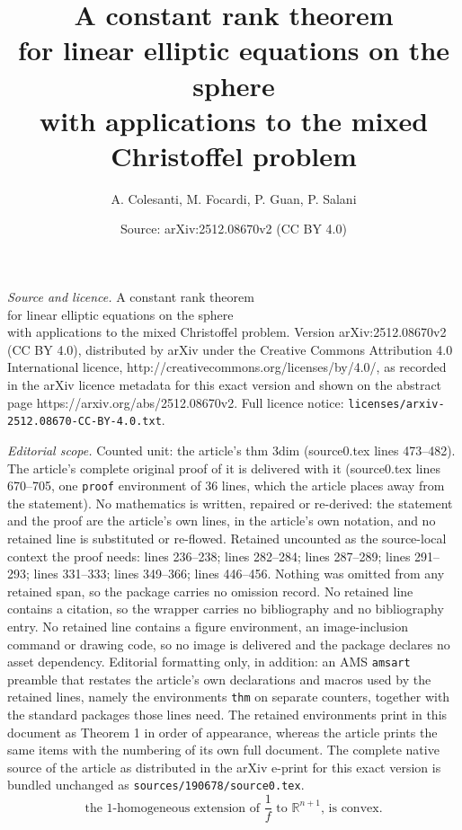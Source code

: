 \documentclass[10pt,a4paper]{amsart}
\title{A constant rank theorem\\ for linear elliptic equations on the sphere\\ with applications to the mixed Christoffel problem}
\author{A. Colesanti, M. Focardi, P. Guan, P. Salani}
\date{Source: arXiv:2512.08670v2 (CC BY 4.0)}
\newcommand{\R}{\mathbb R}
\begin{document}
\maketitle

\noindent\emph{Source and licence.} A constant rank theorem\\ for linear elliptic equations on the sphere\\ with applications to the mixed Christoffel problem. Version arXiv:2512.08670v2 (CC BY 4.0), distributed by arXiv under the Creative Commons Attribution 4.0 International licence, http://creativecommons.org/licenses/by/4.0/, as recorded in the arXiv licence metadata for this exact version and shown on the abstract page https://arxiv.org/abs/2512.08670v2. Full licence notice: \texttt{licenses/arxiv-2512.08670-CC-BY-4.0.txt}.\par\smallskip

\noindent\textit{Editorial scope.} Counted unit: the article's thm 3dim (source0.tex lines 473--482). The article's complete original proof of it is delivered with it (source0.tex lines 670--705, one \texttt{proof} environment of 36 lines, which the article places away from the statement). No mathematics is written, repaired or re-derived: the statement and the proof are the article's own lines, in the article's own notation, and no retained line is substituted or re-flowed.  Retained uncounted as the source-local context the proof needs: lines 236--238; lines 282--284; lines 287--289; lines 291--293; lines 331--333; lines 349--366; lines 446--456.  Nothing was omitted from any retained span, so the package carries no omission record.  No retained line contains a citation, so the wrapper carries no bibliography and no bibliography entry.  No retained line contains a figure environment, an image-inclusion command or drawing code, so no image is delivered and the package declares no asset dependency.  Editorial formatting only, in addition: an AMS \texttt{amsart} preamble that restates the article's own declarations and macros used by the retained lines, namely the environments \texttt{thm} on separate counters, together with the standard packages those lines need.  The retained environments print in this document as Theorem 1 in order of appearance, whereas the article prints the same items with the numbering of its own full document.  The complete native source of the article as distributed in the arXiv e-print for this exact version is bundled unchanged as \texttt{sources/190678/source0.tex}.
\begin{equation}\label{GM condition}
\mbox{the $1$-homogeneous extension of $\dfrac 1f$ to $\R^{n+1}$, is convex.}    
\end{equation} 
\end{document}

